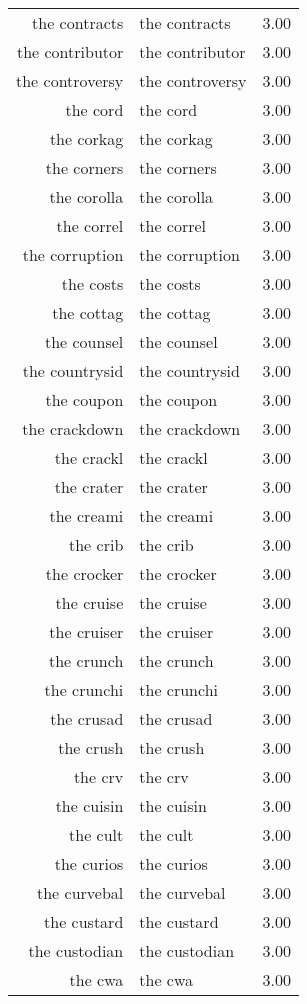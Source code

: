 \begin{table}[ht]
\begin{tabular}{rlr}
  the contracts & the contracts & 3.00 \\ 
  the contributor & the contributor & 3.00 \\ 
  the controversy & the controversy & 3.00 \\ 
  the cord & the cord & 3.00 \\ 
  the corkag & the corkag & 3.00 \\ 
  the corners & the corners & 3.00 \\ 
  the corolla & the corolla & 3.00 \\ 
  the correl & the correl & 3.00 \\ 
  the corruption & the corruption & 3.00 \\ 
  the costs & the costs & 3.00 \\ 
  the cottag & the cottag & 3.00 \\ 
  the counsel & the counsel & 3.00 \\ 
  the countrysid & the countrysid & 3.00 \\ 
  the coupon & the coupon & 3.00 \\ 
  the crackdown & the crackdown & 3.00 \\ 
  the crackl & the crackl & 3.00 \\ 
  the crater & the crater & 3.00 \\ 
  the creami & the creami & 3.00 \\ 
  the crib & the crib & 3.00 \\ 
  the crocker & the crocker & 3.00 \\ 
  the cruise & the cruise & 3.00 \\ 
  the cruiser & the cruiser & 3.00 \\ 
  the crunch & the crunch & 3.00 \\ 
  the crunchi & the crunchi & 3.00 \\ 
  the crusad & the crusad & 3.00 \\ 
  the crush & the crush & 3.00 \\ 
  the crv & the crv & 3.00 \\ 
  the cuisin & the cuisin & 3.00 \\ 
  the cult & the cult & 3.00 \\ 
  the curios & the curios & 3.00 \\ 
  the curvebal & the curvebal & 3.00 \\ 
  the custard & the custard & 3.00 \\ 
  the custodian & the custodian & 3.00 \\ 
  the cwa & the cwa & 3.00 \\ 

\end{tabular}
\end{table}
